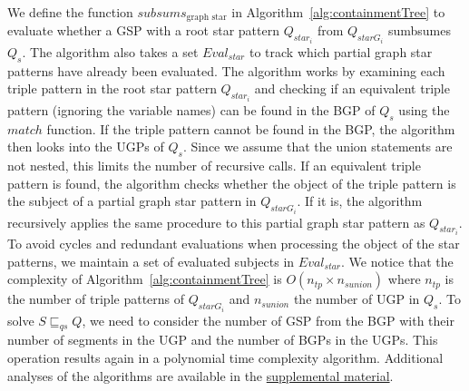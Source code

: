 We define the function $subsums_{\text{graph star}}$ in Algorithm~\ref{alg:containmentTree} to evaluate whether a GSP with a root star pattern $Q_{star_i}$ from $Q_{starG_i}$ sumbsumes $Q_s$. 
The algorithm also takes a set $Eval_{star}$ to track which partial graph star patterns have already been evaluated.
The algorithm works by examining each triple pattern in the root star pattern $Q_{star_i}$ and checking if an equivalent triple pattern (ignoring the variable names) can be found in the BGP of $Q_s$ using the $match$ function.
If the triple pattern cannot be found in the BGP, the algorithm then looks into the UGPs of $Q_s$. 
Since we assume that the union statements are not nested, this limits the number of recursive calls.
If an equivalent triple pattern is found, the algorithm checks whether the object of the triple pattern is the subject of a partial graph star pattern in $Q_{starG_i}$.
If it is, the algorithm recursively applies the same procedure to this partial graph star pattern as $Q_{star_i}$.
To avoid cycles and redundant evaluations when processing the object of the star patterns, we maintain a set of evaluated subjects in $Eval_{star}$.
We notice that the complexity of Algorithm~\ref{alg:containmentTree} is $O(n_{tp} \times n_{sunion})$
where $n_{tp}$ is the number of triple patterns of $Q_{starG_i}$ and $n_{sunion}$ the number of UGP in $Q_s$.
To solve $S \sqsubseteq_{qs} Q$, we need to consider the number of GSP from the BGP with their number of segments in the UGP and the number of BGPs in the UGPs.
This operation results again in a polynomial time complexity algorithm.
Additional analyses of the algorithms are available in the \hyperref[sec:supplementalMaterial]{supplemental material}.
